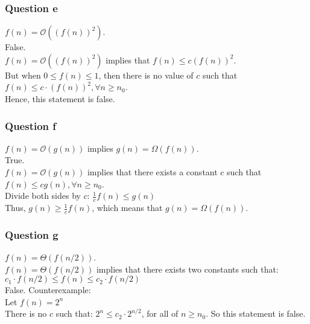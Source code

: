 \documentclass[11pt]{article}
\begin{document}
\subsubsection*{Question e}

$f(n) = \mathcal{O}((f(n))^2)$. \\

False.\\[6pt]
\indent \indent $f(n) = \mathcal{O}((f(n))^2)$ implies that $f(n) \leq c(f(n))^2$.\\[6pt]
\indent \indent But when $0 \leq f(n) \leq 1$, then there is no value of $c$ such that $f(n) \leq c \cdot (f(n))^2,  \forall n \geq n_0$.\\[6pt]
\indent Hence, this statement is false.\\

\newpage
\subsubsection*{Question f}

$f(n) = \mathcal{O}(g(n))$ implies $g(n) = \Omega(f(n))$.\\

True.\\
\indent \indent $f(n) = \mathcal{O}(g(n))$ implies that there exists a constant $c$ such that $f(n) \leq cg(n), \forall n \geq n_0$.\\[6pt]
\indent \indent Divide both sides by $c$:  $\frac{1}{c} f(n) \leq g(n) $\\[6pt]
\indent \indent Thus, $g(n) \geq \frac{1}{c} f(n)$, which means that $g(n)= \Omega(f(n))$.\\[6pt]

\subsubsection*{Question g}

$f(n) = \Theta(f(n/2))$.\\

\indent \indent $f(n) = \Theta(f(n/2))$ implies that there exists two constants such that:\\[6pt]
\indent \indent $c_1 \cdot f(n/2) \leq f(n) \leq c_2 \cdot f(n/2)$ \\[6pt]
\indent False. Counterexample:\\[6pt]
\indent \indent Let $f(n) = 2^n$ \\[6pt]
\indent \indent There is no $c$ such that: $2^n \leq c_2 \cdot 2^{n/2}$, for all of $n \geq n_0$. So this statement is false.\\[6pt]
\end{document}
